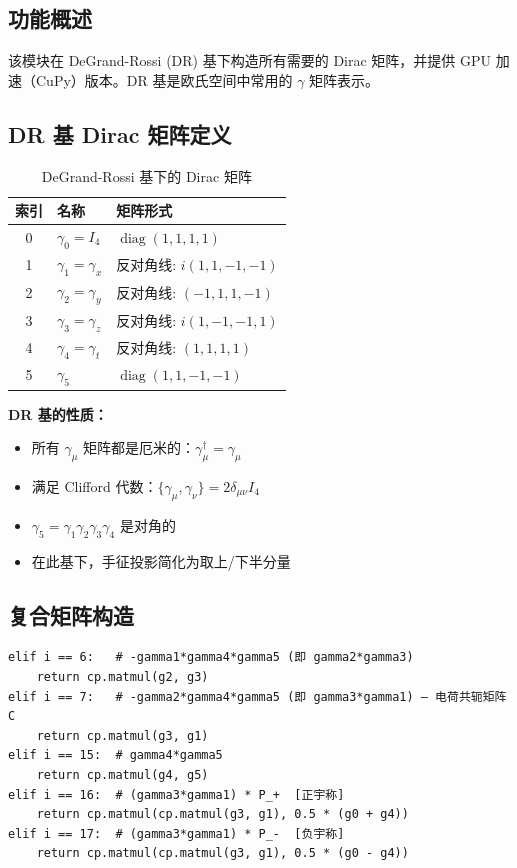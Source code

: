\documentclass[12pt,a4paper]{ctexart}
\begin{document}
\subsection{功能概述}

该模块在 DeGrand-Rossi (DR) 基下构造所有需要的 Dirac 矩阵，并提供 GPU 加速（CuPy）版本。DR 基是欧氏空间中常用的 $\gamma$ 矩阵表示。

\subsection{DR 基 Dirac 矩阵定义}

\begin{table}[H]
\centering
\caption{DeGrand-Rossi 基下的 Dirac 矩阵}
\begin{tabular}{cll}
\toprule
\textbf{索引} & \textbf{名称} & \textbf{矩阵形式} \\
\midrule
0  & $\gamma_0 = I_4$     & $\operatorname{diag}(1,1,1,1)$ \\
1  & $\gamma_1 = \gamma_x$ & 反对角线: $i(1,1,-1,-1)$ \\
2  & $\gamma_2 = \gamma_y$ & 反对角线: $(-1,1,1,-1)$ \\
3  & $\gamma_3 = \gamma_z$ & 反对角线: $i(1,-1,-1,1)$ \\
4  & $\gamma_4 = \gamma_t$ & 反对角线: $(1,1,1,1)$ \\
5  & $\gamma_5$            & $\operatorname{diag}(1,1,-1,-1)$ \\
\bottomrule
\end{tabular}
\end{table}

\textbf{DR 基的性质：}
\begin{itemize}
    \item 所有 $\gamma_\mu$ 矩阵都是厄米的：$\gamma_\mu^\dagger = \gamma_\mu$
    \item 满足 Clifford 代数：$\{\gamma_\mu, \gamma_\nu\} = 2\delta_{\mu\nu} I_4$
    \item $\gamma_5 = \gamma_1\gamma_2\gamma_3\gamma_4$ 是对角的
    \item 在此基下，手征投影简化为取上/下半分量
\end{itemize}

\subsection{复合矩阵构造}

\begin{lstlisting}[caption={复合 Dirac 矩阵}]
elif i == 6:   # -gamma1*gamma4*gamma5 (即 gamma2*gamma3)
    return cp.matmul(g2, g3)
elif i == 7:   # -gamma2*gamma4*gamma5 (即 gamma3*gamma1) — 电荷共轭矩阵 C
    return cp.matmul(g3, g1)
elif i == 15:  # gamma4*gamma5
    return cp.matmul(g4, g5)
elif i == 16:  # (gamma3*gamma1) * P_+  [正宇称]
    return cp.matmul(cp.matmul(g3, g1), 0.5 * (g0 + g4))
elif i == 17:  # (gamma3*gamma1) * P_-  [负宇称]
    return cp.matmul(cp.matmul(g3, g1), 0.5 * (g0 - g4))
\end{lstlisting}
\end{document}
